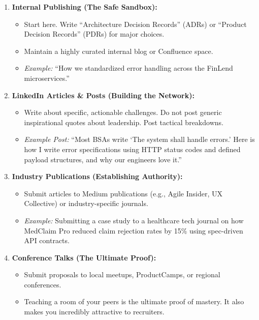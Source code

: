 \begin{enumerate}
\def\labelenumi{\arabic{enumi}.}
\tightlist
\item
  \textbf{Internal Publishing (The Safe Sandbox):}

  \begin{itemize}
  \tightlist
  \item
    Start here. Write ``Architecture Decision Records'' (ADRs) or
    ``Product Decision Records'' (PDRs) for major choices.
  \item
    Maintain a highly curated internal blog or Confluence space.
  \item
    \emph{Example:} ``How we standardized error handling across the
    FinLend microservices.''
  \end{itemize}
\item
  \textbf{LinkedIn Articles \& Posts (Building the Network):}

  \begin{itemize}
  \tightlist
  \item
    Write about specific, actionable challenges. Do not post generic
    inspirational quotes about leadership. Post tactical breakdowns.
  \item
    \emph{Example Post:} ``Most BSAs write `The system shall handle
    errors.' Here is how I write error specifications using HTTP status
    codes and defined payload structures, and why our engineers love
    it.''
  \end{itemize}
\item
  \textbf{Industry Publications (Establishing Authority):}

  \begin{itemize}
  \tightlist
  \item
    Submit articles to Medium publications (e.g., Agile Insider, UX
    Collective) or industry-specific journals.
  \item
    \emph{Example:} Submitting a case study to a healthcare tech journal
    on how MedClaim Pro reduced claim rejection rates by 15\% using
    spec-driven API contracts.
  \end{itemize}
\item
  \textbf{Conference Talks (The Ultimate Proof):}

  \begin{itemize}
  \tightlist
  \item
    Submit proposals to local meetups, ProductCamps, or regional
    conferences.
  \item
    Teaching a room of your peers is the ultimate proof of mastery. It
    also makes you incredibly attractive to recruiters.
  \end{itemize}
\end{enumerate}

